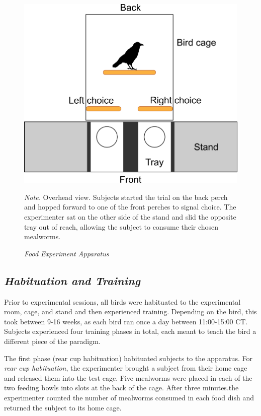 \documentclass[
  ,pub,floatsintext]{apa6}
\begin{document}
\begin{figure}[t]
\caption{\newline \emph{Food Experiment Apparatus} \label{fig:foodapp}}
\begin{center}
\includegraphics[width=0.75\linewidth]{"figures/food_apparatus.png"}
\end{center}

\textit{Note.} Overhead view. Subjects started the trial on the back perch and hopped forward to one of the front perches to signal choice. The experimenter sat on the other side of the stand and slid the opposite tray out of reach, allowing the subject to consume their chosen mealworms.
\end{figure}

\hypertarget{habituation-and-training}{%
\subsection{\texorpdfstring{\emph{Habituation and Training}}{Habituation and Training}}\label{habituation-and-training}}

Prior to experimental sessions, all birds were habituated to the experimental room, cage, and stand and then experienced training. Depending on the bird, this took between 9-16 weeks, as each bird ran once a day between 11:00-15:00 CT. Subjects experienced four training phases in total, each meant to teach the bird a different piece of the paradigm.

The first phase (rear cup habituation) habituated subjects to the apparatus. For \emph{rear cup habituation}, the experimenter brought a subject from their home cage and released them into the test cage. Five mealworms were placed in each of the two feeding bowls into slots at the back of the cage. After three minutes.the experimenter counted the number of mealworms consumed in each food dish and returned the subject to its home cage.
\end{document}
